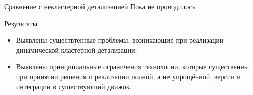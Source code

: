\documentclass{beamer}
\begin{document}
    \begin{frame}{Сравнение с некластерной детализацией}
        Пока не проводилось
    \end{frame}

    \begin{frame}{Результаты}
        \begin{itemize}
            \item Выявлены существтенные проблемы,
            возникающие при реализации
            динамической кластерной детализации;

            \item Выявлены принципиальные
            ограничения технологии,
            которые существенны при принятии решения
            о реализации полной, а не упрощённой,
            версии и интеграции в существующий движок.
        \end{itemize}
    \end{frame}
\end{document}
